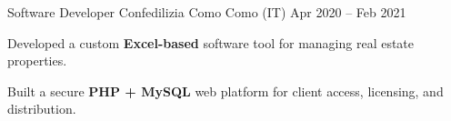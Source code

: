 
\cventry
{Software Developer}
{Confedilizia Como}
{Como (IT)}
{Apr 2020 -- Feb 2021}
{
    \begin{cvitems}
        \item {Developed a custom \textbf{Excel-based} software tool for managing real estate properties.}
        \item {Built a secure \textbf{PHP + MySQL} web platform for client access, licensing, and distribution.}
    \end{cvitems}
}
